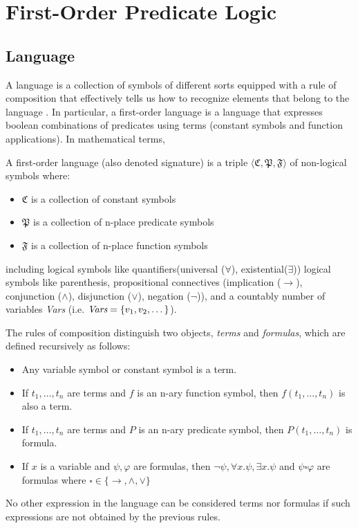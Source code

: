 \section{First-Order Predicate Logic}

\subsection{Language}
A language is a collection of symbols of different sorts equipped with a rule of composition that effectively tells us how to recognize elements that belong to the language \cite{DBLP:books/daglib/0080654}. In particular, a first-order language is a language that expresses boolean combinations of predicates using terms (constant symbols and function applications). In mathematical terms, 

\begin{definition}
 A first-order language (also denoted signature) is a triple $\langle \mathfrak{C}, \mathfrak{P}, \mathfrak{F} \rangle$ of non-logical symbols where:

\begin{itemize}
  \item $\mathfrak{C}$ is a collection of constant symbols
  \item $\mathfrak{P}$ is a collection of n-place predicate symbols
  \item $\mathfrak{F}$ is a collection of n-place function symbols
\end{itemize}

including logical symbols like quantifiers(universal ($\forall$), existential($\exists$)) logical symbols like parenthesis, propositional connectives (implication ($\rightarrow$), conjunction ($\land$), disjunction ($\lor$), negation ($\neg$)), and a countably number of variables \emph{Vars} (i.e. $\emph{Vars} = \{v_1, v_2, \dots\}$).

The rules of composition distinguish two objects, \emph{terms} and \emph{formulas}, which are defined recursively as follows:

\begin{itemize}
  \item Any variable symbol or constant symbol is a term.
  \item If $t_1, \dots, t_n$ are terms and $f$ is an n-ary function symbol, then $f(t_1, \dots, t_n)$ is also a term.
  \item If $t_1, \dots, t_n$ are terms and $P$ is an n-ary predicate symbol, then $P(t_1, \dots, t_n)$ is formula.
  \item If $x$ is a variable and $\psi, \varphi$ are formulas, then $\neg \psi, \forall x . \psi, \exists x . \psi$ and $\psi \square \varphi$ are formulas where $\square \in \{\rightarrow, \land, \lor\}$
\end{itemize}
No other expression in the language can be considered terms nor formulas if such expressions are not obtained by the previous rules.


\end{definition}
